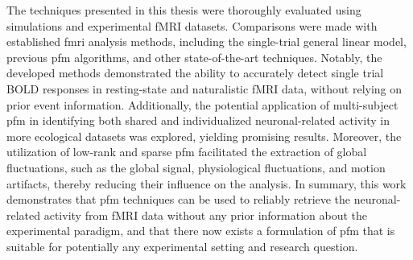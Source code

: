 The techniques presented in this thesis were thoroughly evaluated using
simulations and experimental fMRI datasets. Comparisons were made with
established \acrshort*{fmri} analysis methods, including the single-trial
general linear model, previous \acrshort*{pfm} algorithms, and other
state-of-the-art techniques. Notably, the developed methods demonstrated the
ability to accurately detect single trial BOLD responses in resting-state and
naturalistic fMRI data, without relying on prior event information.
Additionally, the potential application of multi-subject \acrshort*{pfm} in
identifying both shared and individualized neuronal-related activity in more
ecological datasets was explored, yielding promising results. Moreover, the
utilization of low-rank and sparse \acrshort*{pfm} facilitated the extraction of
global fluctuations, such as the global signal, physiological fluctuations, and
motion artifacts, thereby reducing their influence on the analysis. In summary,
this work demonstrates that \acrshort*{pfm} techniques can be used to reliably
retrieve the neuronal-related activity from fMRI data without any prior
information about the experimental paradigm, and that there now exists a
formulation of \acrshort*{pfm} that is suitable for potentially any experimental
setting and research question.

